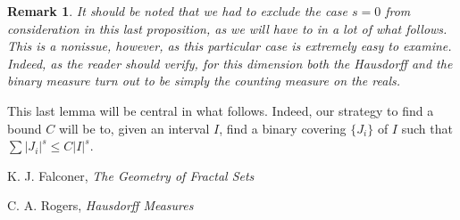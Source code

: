\documentclass[11pt]{amsart}
\newtheorem*{remark}{Remark}
\begin{document}
\begin{remark}
It should be noted that we had to exclude the case $s = 0$ from consideration in this last proposition, as we will have to in a lot of what follows. This is a nonissue, however, as this particular case is extremely easy to examine. Indeed, as the reader should verify, for this dimension both the Hausdorff and the binary measure turn out to be simply the counting measure on the reals.
\end{remark}

This last lemma will be central in what follows. Indeed, our strategy to find a bound $C$ will be to, given an interval $I$, find a binary covering $\{J_i\}$ of $I$ such that $\sum \lvert J_i \rvert^s \leq C \lvert I \rvert^s$.


\begin{thebibliography}{1}
K. J. Falconer, \textit{The Geometry of Fractal Sets}

C. A. Rogers, \textit{Hausdorff Measures}

\end{thebibliography}
\end{document}
